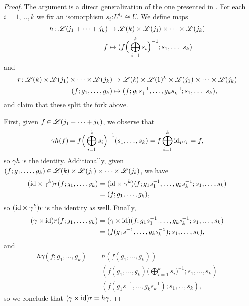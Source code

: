 \documentclass[openany, amssymb, psamsfonts]{amsart}
\theoremstyle{definition}
\numberwithin{equation}{section}
\begin{document}
\begin{proof} The argument is a direct generalization of the one presented in \cite{EKMM}. For each $i = 1, \dots, k$ we fix an isomorphism $s_i \colon U^{i_k} \cong U$. We define maps
\begin{align*}
    h \colon \mathscr{L}(j_1 + \cdots + j_k) &\to \mathscr{L}(k) \times \mathscr{L}(j_1) \times \cdots \times \mathscr{L}(j_k)\\
    f &\mapsto (f \Big(\bigoplus_{i = 1}^k s_i\Big)^{-1}; s_1, \dots, s_k)
\end{align*} and
\begin{align*}
    r \colon \mathscr{L}(k) \times \mathscr{L}(j_1) \times \cdots \times \mathscr{L}(j_k) &\to \mathscr{L}(k) \times \mathscr{L}(1)^k \times \mathscr{L}(j_1) \times \cdots \times \mathscr{L}(j_k)\\
    (f; g_1, \dots, g_k) &\mapsto (f; g_1 s_1^{-1}, \dots, g_k s_k^{-1}; s_1, \dots, s_k),
\end{align*} and claim that these split the fork above.

First, given $f \in \mathscr{L}(j_1 + \cdots + j_k)$, we observe that
\begin{equation*}
    \gamma h(f) = f  \Big(\bigoplus_{i = 1}^k s_i\Big)^{-1}(s_1, \dots, s_k) = f \bigoplus_{i = 1}^k \mathrm{id}_{U^{j_i}} = f,
\end{equation*} so $\gamma h$ is the identity. Additionally, given $(f; g_1, \dots, g_k) \in \mathscr{L}(k) \times \mathscr{L}(j_1) \times \cdots \times \mathscr{L}(j_k)$, we have
\begin{align*}
    (\mathrm{id} \times \gamma^k)r(f; g_1, \dots, g_k) &= (\mathrm{id} \times \gamma^k)(f; g_1 s_1^{-1}, \dots, g_k s_k^{-1}; s_1, \dots, s_k)\\
    &= (f; g_1, \dots, g_k),
\end{align*} so $(\mathrm{id} \times \gamma^k)r$ is the identity as well. Finally, 
\begin{align*}
    (\gamma \times \mathrm{id})r(f; g_1, \dots, g_k) &= (\gamma \times \mathrm{id})(f; g_1 s_1^{-1}, \dots, g_k s_k^{-1}; s_1, \dots, s_k)\\
    &= (f(g_1s^{-1}, \dots, g_ks_k^{-1}); s_1, \dots, s_k),
\end{align*} and
\begin{align*}
    h\gamma (f; g_1, \dots, g_k) &= h (f(g_1, \dots, g_k))\\
    &= (f(g_1, \dots, g_k) \Big(\bigoplus_{i = 1}^k s_i\Big)^{-1}; s_1, \dots, s_k)\\
    &= (f(g_1s^{-1}, \dots, g_ks_k^{-1}); s_1, \dots, s_k),
\end{align*} so we conclude that $(\gamma \times \mathrm{id})r = h\gamma$.
\end{proof}
\end{document}
